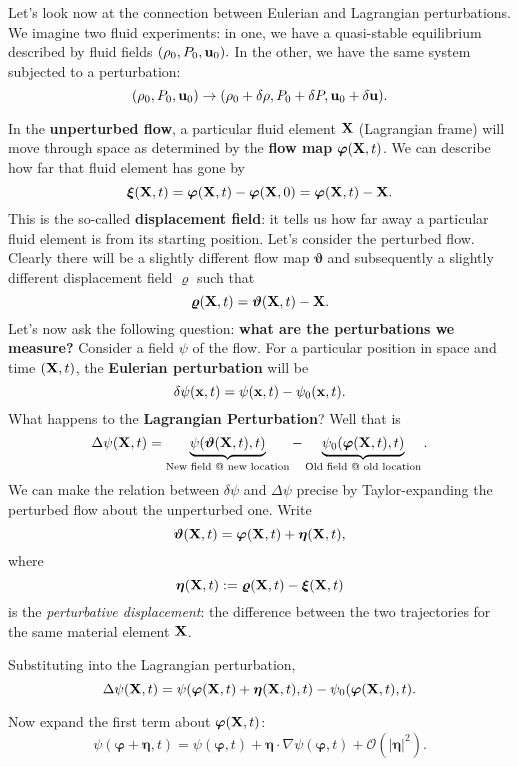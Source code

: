 Let's look now at the connection between Eulerian and Lagrangian perturbations. We imagine two fluid experiments: in one, we have a quasi-stable equilibrium described by fluid fields $(\rho_0,P_0,{\bf u}_0).$ In the other, we have the same system subjected to a perturbation:
\[
(\rho_0,P_0,{\bf u}_0) \to (\rho_0 + \delta \rho,P_0+\delta P, {\bf u}_0 + \delta {\bf u}).
\]
\par
In the \textbf{unperturbed flow}, a particular fluid element ${\bf X}$ (Lagrangian frame) will move through space as determined by the \textbf{flow map} $\boldsymbol{\varphi}({\bf X},t)$. We can describe how far that fluid element has gone by
\[
\boldsymbol{\xi}({\bf X},t) = \boldsymbol{\varphi}({\bf X},t) - \boldsymbol{\varphi}({\bf X},0) = \boldsymbol{\varphi}({\bf X},t) - {\bf X}.
\]
This is the so-called \textbf{displacement field}: it tells us how far away a particular fluid element is from its starting position. Let's consider the perturbed flow. Clearly there will be a slightly different flow map $\boldsymbol{\vartheta}$ and subsequently a slightly different displacement field $\boldsymbol{\varrho}$ such that
\[
\boldsymbol{\varrho}({\bf X},t) = \boldsymbol{\vartheta}({\bf X},t) - {\bf X}.
\]
Let's now ask the following question: \textbf{what are the perturbations we measure?} Consider a field $\psi$ of the flow. For a particular position in space and time $({\bf X},t)$, the \textbf{Eulerian perturbation} will be
\[
\delta \psi({\bf x},t) = \psi({\bf x},t) - \psi_0({\bf x},t).
\]
What happens to the \textbf{Lagrangian Perturbation}? Well that is
\[
\Delta \psi({\bf X},t) = \underbrace{\psi(\boldsymbol{\vartheta}({\bf X},t),t)}_{\text{New field @ new location}} - \underbrace{\psi_0(\boldsymbol{\varphi}({\bf X},t),t)}_{\text{Old field @ old location}}.
\]
We can make the relation between $\delta\psi$ and $\Delta\psi$ precise by Taylor-expanding the perturbed flow about the unperturbed one.  Write
\[
\boldsymbol{\vartheta}({\bf X},t) = \boldsymbol{\varphi}({\bf X},t) 
+ \boldsymbol{\eta}({\bf X},t),
\]
where 
\[
\boldsymbol{\eta}({\bf X},t) := \boldsymbol{\varrho}({\bf X},t) - \boldsymbol{\xi}({\bf X},t)
\]
is the \emph{perturbative displacement}: the difference between the two trajectories for the same material element ${\bf X}$.

Substituting into the Lagrangian perturbation,
\[
\Delta \psi({\bf X},t) 
= \psi(\boldsymbol{\varphi}({\bf X},t) + \boldsymbol{\eta}({\bf X},t),t)
- \psi_0(\boldsymbol{\varphi}({\bf X},t),t).
\]

Now expand the first term about $\boldsymbol{\varphi}({\bf X},t)$:
\[
\psi(\boldsymbol{\varphi}+\boldsymbol{\eta},t)
= \psi(\boldsymbol{\varphi},t) 
+ \boldsymbol{\eta}\cdot\nabla\psi(\boldsymbol{\varphi},t) 
+ \mathcal{O}(|\boldsymbol{\eta}|^2).
\]

